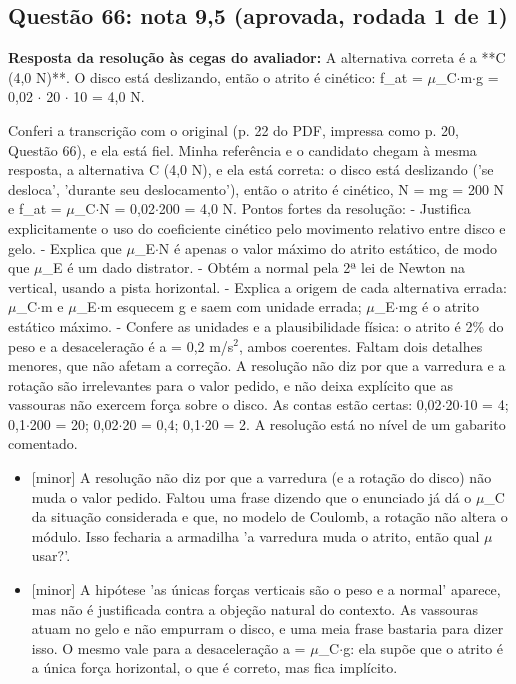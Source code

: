 \documentclass{article}%
\begin{document}
\subsection*{Questão 66: nota 9,5 (aprovada, rodada 1 de 1)}%
\textbf{Resposta da resolução às cegas do avaliador:} A alternativa correta é a **C (4,0 N)**. O disco está deslizando, então o atrito é cinético: f\_at = $\mu$\_C$\cdot$m$\cdot$g = 0,02 $\cdot$ 20 $\cdot$ 10 = 4,0 N.\par %
Conferi a transcrição com o original (p. 22 do PDF, impressa como p. 20, Questão 66), e ela está fiel. Minha referência e o candidato chegam à mesma resposta, a alternativa C (4,0 N), e ela está correta: o disco está deslizando ('se desloca', 'durante seu deslocamento'), então o atrito é cinético, N = mg = 200 N e f\_at = $\mu$\_C$\cdot$N = 0,02$\cdot$200 = 4,0 N.\newline%
\newline%
Pontos fortes da resolução:\newline%
{-} Justifica explicitamente o uso do coeficiente cinético pelo movimento relativo entre disco e gelo.\newline%
{-} Explica que $\mu$\_E$\cdot$N é apenas o valor máximo do atrito estático, de modo que $\mu$\_E é um dado distrator.\newline%
{-} Obtém a normal pela 2ª lei de Newton na vertical, usando a pista horizontal.\newline%
{-} Explica a origem de cada alternativa errada: $\mu$\_C$\cdot$m e $\mu$\_E$\cdot$m esquecem g e saem com unidade errada; $\mu$\_E$\cdot$mg é o atrito estático máximo.\newline%
{-} Confere as unidades e a plausibilidade física: o atrito é 2\% do peso e a desaceleração é a = 0,2 m/s$^2$, ambos coerentes.\newline%
\newline%
Faltam dois detalhes menores, que não afetam a correção. A resolução não diz por que a varredura e a rotação são irrelevantes para o valor pedido, e não deixa explícito que as vassouras não exercem força sobre o disco.\newline%
\newline%
As contas estão certas: 0,02$\cdot$20$\cdot$10 = 4; 0,1$\cdot$200 = 20; 0,02$\cdot$20 = 0,4; 0,1$\cdot$20 = 2. A resolução está no nível de um gabarito comentado.%
\begin{itemize}%
\item%
{[}minor{]} A resolução não diz por que a varredura (e a rotação do disco) não muda o valor pedido. Faltou uma frase dizendo que o enunciado já dá o $\mu$\_C da situação considerada e que, no modelo de Coulomb, a rotação não altera o módulo. Isso fecharia a armadilha 'a varredura muda o atrito, então qual $\mu$ usar?'.%
\item%
{[}minor{]} A hipótese 'as únicas forças verticais são o peso e a normal' aparece, mas não é justificada contra a objeção natural do contexto. As vassouras atuam no gelo e não empurram o disco, e uma meia frase bastaria para dizer isso. O mesmo vale para a desaceleração a = $\mu$\_C$\cdot$g: ela supõe que o atrito é a única força horizontal, o que é correto, mas fica implícito.%
\end{itemize}%
\end{document}
